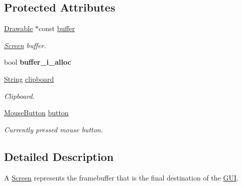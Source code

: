 \subsection*{Protected Attributes}
\begin{DoxyCompactItemize}
\item 
\hypertarget{classGUI_1_1Screen_a30b34167fe1aad767a0f7fcfd617ddfa}{\hyperlink{classGUI_1_1Drawable}{Drawable} $\ast$const \hyperlink{classGUI_1_1Screen_a30b34167fe1aad767a0f7fcfd617ddfa}{buffer}}\label{classGUI_1_1Screen_a30b34167fe1aad767a0f7fcfd617ddfa}

\begin{DoxyCompactList}\small\item\em \hyperlink{classGUI_1_1Screen}{Screen} buffer. \end{DoxyCompactList}\item 
\hypertarget{classGUI_1_1Screen_aea9148e41c5bd314d068f879ed3e199f}{bool {\bfseries buffer\-\_\-i\-\_\-alloc}}\label{classGUI_1_1Screen_aea9148e41c5bd314d068f879ed3e199f}

\item 
\hypertarget{classGUI_1_1Screen_ae1bac72316cf4d07b19c2e4ae497e272}{\hyperlink{classGUI_1_1String}{String} \hyperlink{classGUI_1_1Screen_ae1bac72316cf4d07b19c2e4ae497e272}{clipboard}}\label{classGUI_1_1Screen_ae1bac72316cf4d07b19c2e4ae497e272}

\begin{DoxyCompactList}\small\item\em Clipboard. \end{DoxyCompactList}\item 
\hypertarget{classGUI_1_1Screen_a76597fbd366faf61d3a26f698e82e1f7}{\hyperlink{namespaceGUI_ad06082a7b02aa73697f39eb8e0856de9}{Mouse\-Button} \hyperlink{classGUI_1_1Screen_a76597fbd366faf61d3a26f698e82e1f7}{button}}\label{classGUI_1_1Screen_a76597fbd366faf61d3a26f698e82e1f7}

\begin{DoxyCompactList}\small\item\em Currently pressed mouse button. \end{DoxyCompactList}\end{DoxyCompactItemize}


\subsection{Detailed Description}
A \hyperlink{classGUI_1_1Screen}{Screen} represents the framebuffer that is the final destination of the \hyperlink{namespaceGUI}{G\-U\-I}. 

